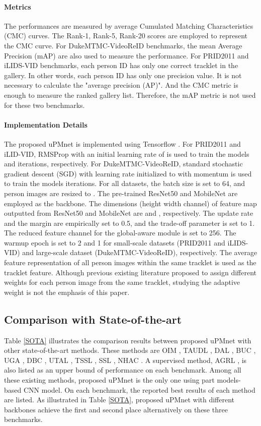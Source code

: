 \documentclass{cta-author}
\begin{document}
	\paragraph{Metrics}
	The performances are measured by average Cumulated Matching Characteristics (CMC) curves. The Rank-1, Rank-5, Rank-20 scores are employed to represent the CMC curve. For DukeMTMC-VideoReID benchmarks, the mean Average Precision (mAP) are also used to measure the performance. For PRID2011 and iLIDS-VID benchmarks, each person ID has only one correct tracklet in the gallery. In other words, each person ID has only one precision value. It is not necessary to calculate the "average precision (AP)". And the CMC metric is enough to measure the ranked gallery list. Therefore, the mAP metric is not used for these two benchmarks.
	
	\paragraph{Implementation Details}
	The proposed uPMnet is implemented using Tensorflow \cite{RN398}. For PRID2011 and iLID-VID, RMSProp with an initial learning rate of  is used to train the models  and  iterations, respectively. For DukeMTMC-VideoReID, standard stochastic gradient descent (SGD) with learning rate initialized to  with momentum is used to train the models  iterations. For all datasets, the batch size  is set to 64, and person images are resized to . 
	The pre-trained ResNet50 \cite{RN73} and  MobileNet \cite{RN228} are employed as the backbone. The dimensions (height  width  channel) of feature map outputted from ResNet50 and MobileNet are  and , respectively. 
	The update rate  and the margin  are empirically set to 0.5, and the trade-off parameter  is set to 1. The reduced feature channel  for the global-aware module is set to 256. The warmup epoch  is set to 2 and 1 for small-scale datasets (PRID2011 and iLIDS-VID) and large-scale dataset (DukeMTMC-VideoReID), respectively. The average feature representation of all person images within the same tracklet is used as the tracklet feature. Although previous existing literature \cite{RN92} \cite{RN533} proposed to assign different weights for each person image from the same tracklet, studying the adaptive weight is not the emphasis of this paper. 
	
	\subsection{Comparison with State-of-the-art}
	Table \ref{SOTA} illustrates the comparison results between proposed uPMnet with other state-of-the-art methods. These methods are OIM \cite{RN248}, TAUDL \cite{RN369}, DAL \cite{RN87}, BUC \cite{RN247}, UGA \cite{RN370}, DBC \cite{RN118}, UTAL \cite{RN97}, TSSL \cite{RN389}, SSL \cite{RN492}, NHAC \cite{RN536}. A supervised method, AGRL \cite{RN442}, is also listed as an upper bound of performance on each benchmark. Among all these existing methods, proposed uPMnet is the only one using part models-based CNN model. On each benchmark, the reported best results of each method are listed. As illustrated in Table \ref{SOTA}, proposed uPMnet with different backbones achieve the first and second place alternatively on these three benchmarks.
	
\end{document}
